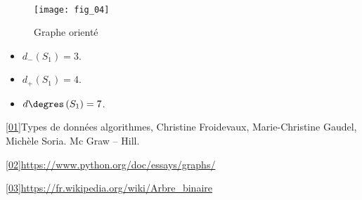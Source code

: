 \begin{exemple}~\\

\begin{multicols}{2}
\begin{figure}[H]
\centering
\texttt{[image: fig\_04]}
\captionsetup{justification=centering}
\caption{Graphe orienté \label{fig_04}}
\end{figure}

\begin{itemize}
\item $d_{-}\left(S_1\right)=3$.
\item $d_{+}\left(S_1\right)=4$.
\item $d\degres\left(S_1\right)=7$.
\end{itemize}
\end{multicols}

\end{exemple}


\begin{defi}

\end{defi}


\begin{defi}[Cycle]

\end{defi}


\begin{defi}

\end{defi}







\ref{01}{Types de données algorithmes, Christine Froidevaux, Marie-Christine Gaudel, Michèle Soria. Mc Graw -- Hill.}

\ref{02}{\url{https://www.python.org/doc/essays/graphs/}}

\ref{03}{\url{https://fr.wikipedia.org/wiki/Arbre_binaire}}
